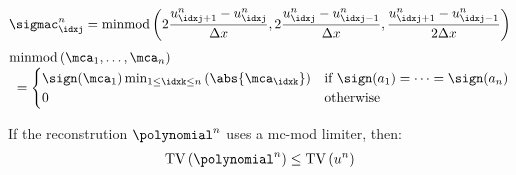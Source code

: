 \begin{defnbox}\nospacing
    \begin{defn}\label{defn:monotonized_centreal_limiter}
        \begin{align}
          \sigmac_{\idxj}^{n}=\text{minmod} \left(2\frac{u_{\idxj+1}^{n}-u_{\idxj}^{n}}{\Delta x},2\frac{u_{\idxj}^{n}-u_{\idxj-1}^{n}}{\Delta x},\frac{u_{\idxj+1}^{n}-u_{\idxj-1}^{n}}{2\Delta x}\right)\nonumber
        \end{align}
        \begin{align}
          &\text{minmod}\left(\mca_{1},\ldots,\mca_{n}\right)\\[-1\jot]
          &\hspace{1mm}=\begin{cases}
              \sign(\mca_{1})\min_{1\leq\idxk\leq n}\left(\abs{\mca_{\idxk}}\right)&\text{if }\sign(a_{1})=\cdots=\sign(a_{n}) \\
              0&\text{otherwise}
          \end{cases}\nonumber
        \end{align}
    \end{defn}
\end{defnbox}
\begin{corbox}\nospacing
    \begin{cor}[MC is TVD]\label{cor:mc_is_tvd}
        If the reconstrution $\polynomial^{n}$ uses a mc-mod limiter, then:
        \begin{align}
          \text{TV} \left(\polynomial^{n}\right)\leq \text{TV}\left(u^{n}\right)
        \end{align}
    \end{cor}
\end{corbox}
